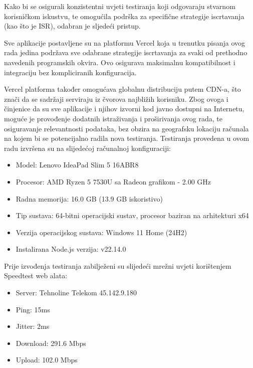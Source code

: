 Kako bi se osigurali konzistentni uvjeti testiranja koji odgovaraju stvarnom korisničkom iskustvu, te omogućila podrška za specifične strategije iscrtavanja (kao što je ISR), odabran je sljedeći pristup.

\bigskip

Sve aplikacije postavljene su na platformu Vercel koja u trenutku pisanja ovog rada jedina podržava sve odabrane strategije iscrtavanja za svaki od prethodno navedenih programskih okvira. Ovo osigurava maksimalnu kompatibilnost i integraciju bez kompliciranih konfiguracija.\cite{vercelframeworks}

\bigskip

Vercel platforma također omogućava globalnu distribuciju putem CDN-a, što znači da se sadržaji serviraju iz čvorova najbližih korisniku. Zbog ovoga i činjenice da su sve aplikacije i njihov izvorni kod javno dostupni na Internetu, moguće je provođenje dodatnih istraživanja i proširivanja ovog rada, te osiguravanje relevantnosti podataka, bez obzira na geografsku lokaciju računala na kojem bi se potencijalno radila nova testiranja.
Testiranja provedena u ovom radu izvršena su na slijedećoj računalnoj konfiguraciji:

\bigskip

\begin{itemize}
    \item Model: Lenovo IdeaPad Slim 5 16ABR8
    \item Procesor: AMD Ryzen 5 7530U sa Radeon grafikom - 2.00 GHz
    \item Radna memorija: 16.0 GB (13.9 GB iskoristivo)
    \item Tip sustava: 64-bitni operacijski sustav, procesor baziran na arhitekturi x64
    \item Verzija operacijskog sustava: Windows 11 Home (24H2)
    \item Instalirana Node.js verzija: v22.14.0
\end{itemize}

Prije izvođenja testiranja zabilježeni su slijedeći mrežni uvjeti korištenjem Speedtest web alata:

\begin{itemize}
    \item Server: Tehnoline Telekom 45.142.9.180
    \item Ping: 15ms
    \item Jitter: 2ms
    \item Download: 291.6 Mbps
    \item Upload: 102.0 Mbps
\end{itemize}
